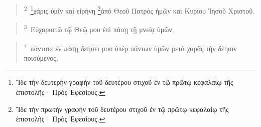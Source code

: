 \documentclass{article}
\newcommand{\currentverse}{1} %
\newcommand{\setcurrentverse}[1]{\renewcommand{\currentverse}{#1}}
\begin{document}
\begin{verse}

\setcurrentverse{2}

\setcounter{footnote}{0}

\textsuperscript{2}~\footnote{Ἴδε τὴν δευτερὴν γραφήν τοῦ δευτέρου στιχοῦ ἐν τῷ πρῶτῳ κεφαλαίῳ τῆς ἐπιστολῆς· Πρὸς Ἐφεσίους.}χάρις ὑμῖν καὶ εἰρήνη \footnote{Ἴδε τὴν πρωτὴν γραφήν τοῦ δευτέρου στιχοῦ ἐν τῷ πρῶτῳ κεφαλαίῳ τῆς ἐπιστολῆς· Πρὸς Ἐφεσίους.}ἀπὸ Θεοῦ Πατρὸς ἡμῶν καὶ Κυρίου Ἰησοῦ Χριστοῦ.

\end{verse}

\begin{verse}

\setcurrentverse{3}

\setcounter{footnote}{0}

\textsuperscript{3}~Εὐχαριστῶ τῷ Θεῷ μου ἐπὶ πάσῃ τῇ μνείᾳ ὑμῶν,

\end{verse}

\begin{verse}

\setcurrentverse{4}

\setcounter{footnote}{0}

\textsuperscript{4}~πάντοτε ἐν πάσῃ δεήσει μου ὑπὲρ πάντων ὑμῶν μετὰ χαρᾶς τὴν δέησιν ποιούμενος,

\end{verse}
\end{document}

